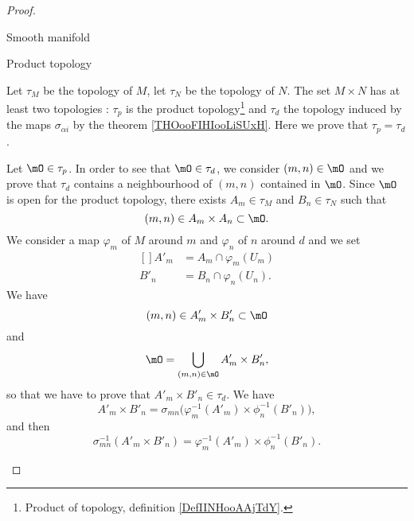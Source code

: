 \begin{proof}
	\begin{proofpart}
		Smooth manifold
	\end{proofpart}
	\begin{proofpart}
		Product topology
	\end{proofpart}
	Let \( \tau_M\) be the topology of \( M\), let \( \tau_N\) be the topology of \( N\). The set \( M\times N\) has at least two topologies : \( \tau_p\) is the product topology\footnote{Product of topology, definition \ref{DefIINHooAAjTdY}.} and \( \tau_d\) the topology induced by the maps \( \sigma_{\alpha i}\) by the theorem \ref{THOooFIHIooLiSUxH}. Here we prove that \( \tau_p=\tau_d\).

	\begin{subproof}
		Let \( \mO\in\tau_p\). In order to see that \( \mO\in \tau_d\), we consider \( (m,n)\in \mO\) and we prove that \( \tau_d\) contains a neighbourhood of \( (m,n)\) contained in \( \mO\). Since \( \mO\) is open for the product topology, there exists \( A_m\in\tau_M\) and \( B_n\in \tau_N\) such that
		\begin{equation}
			(m,n)\in A_m\times A_n\subset\mO.
		\end{equation}
		We consider a map \( \varphi_m\) of \( M\) around \( m\) and \( \varphi_n\) of \( n\) around \( d\) and we set
		\begin{equation}
			\begin{aligned}[]
				A'_m & =A_m\cap \varphi_m(U_m)  \\
				B'_n & =B_n\cap \varphi_n(U_n).
			\end{aligned}
		\end{equation}
		We have
		\begin{equation}
			(m,n)\in A'_m\times B'_n\subset \mO
		\end{equation}
		and
		\begin{equation}
			\mO=\bigcup_{(m,n)\in \mO}A'_m\times B'_n,
		\end{equation}
		so that we have to prove that \( A'_m\times B'_n\in\tau_d\). We have
		\begin{equation}
			A'_m\times B'_n=\sigma_{mn}\big( \varphi_m^{-1}(A'_m)\times \phi_n^{-1}(B'_n) \big),
		\end{equation}
		and then
		\begin{equation}		\label{EQooAMYEooMZVThm}
			\sigma_{mn}^{-1}(A'_m\times B'_n)=\varphi_m^{-1}(A'_m)\times \phi_n^{-1}(B'_n).
		\end{equation}


\end{subproof}
\end{proof}
